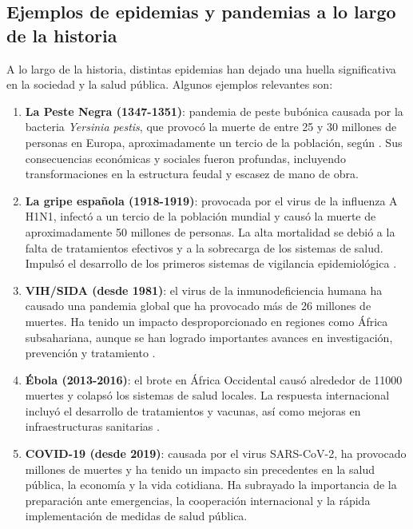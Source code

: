 \subsection{Ejemplos de epidemias y pandemias a lo largo de la historia}
A lo largo de la historia, distintas epidemias han dejado una huella significativa en la sociedad y la salud pública. Algunos ejemplos relevantes son:
\begin{enumerate}
    \item \textbf{La Peste Negra (1347-1351)}: pandemia de peste bubónica causada por la bacteria \textit{Yersinia pestis}, que provocó la muerte de entre 25 y 30 millones de personas en Europa, aproximadamente un tercio de la población, según \cite{patterson2021societal}. Sus consecuencias económicas y sociales fueron profundas, incluyendo transformaciones en la estructura feudal y escasez de mano de obra. 
    
    \item \textbf{La gripe española (1918-1919)}: provocada por el virus de la influenza A H1N1, infectó a un tercio de la población mundial y causó la muerte de aproximadamente 50 millones de personas. La alta mortalidad se debió a la falta de tratamientos efectivos y a la sobrecarga de los sistemas de salud. Impulsó el desarrollo de los primeros sistemas de vigilancia epidemiológica \cite{kilbourne2006influenza}.
    
  
    \item \textbf{VIH/SIDA (desde 1981)}: el virus de la inmunodeficiencia humana ha causado una pandemia global que ha provocado más de 26 millones de muertes. Ha tenido un impacto desproporcionado en regiones como África subsahariana, aunque se han logrado importantes avances en investigación, prevención y tratamiento \cite{miranda2022tale}.
    \item \textbf{Ébola (2013-2016)}: el brote en África Occidental causó alrededor de 11000 muertes y colapsó los sistemas de salud locales. La respuesta internacional incluyó el desarrollo de tratamientos y vacunas, así como mejoras en infraestructuras sanitarias \cite{who2014ebola}.
    \item \textbf{COVID-19 (desde 2019)}: causada por el virus SARS-CoV-2, ha provocado millones de muertes y ha tenido un impacto sin precedentes en la salud pública, la economía y la vida cotidiana. Ha subrayado la importancia de la preparación ante emergencias, la cooperación internacional y la rápida implementación de medidas de salud pública. 
\end{enumerate}    


